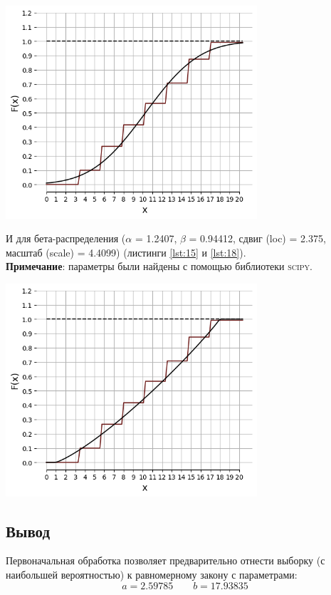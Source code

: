 \documentclass[a4paper, 14pt]{extarticle}
\begin{document}
\begin{center}
    \includegraphics[width=0.7\textwidth]{LW1_32_0}
\end{center}

И для бета-распределения ($\alpha$ = 1.2407, $\beta$ = 0.94412, сдвиг (loc) = 2.375,
масштаб (scale) = 4.4099) 
(листинги \ref{lst:15} и \ref{lst:18}).\\
{ \footnotesize \textbf{Примечание}: параметры были найдены с помощью библиотеки 
\textsc{scipy}}.

\begin{center}
    \includegraphics[width=0.7\textwidth]{LW1_33_0}
\end{center}

\subsection{Вывод}

Первоначальная обработка позволяет предварительно отнести выборку
(с наибольшей вероятностью) к равномерному закону с параметрами:
\begin{equation*}
    a = 2.59785 \qquad b = 17.93835
\end{equation*}
\end{document}
